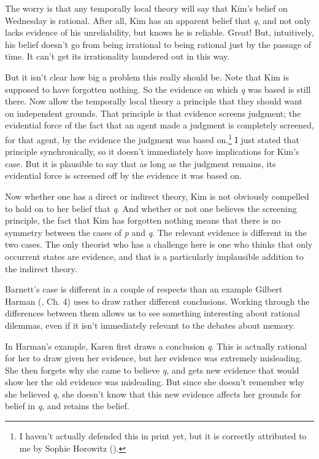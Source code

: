 \documentclass[
  10pt,
  letterpaper,
  DIV=11,
  numbers=noendperiod,
  twoside]{scrartcl}
\begin{document}
The worry is that any temporally local theory will say that Kim's belief
on Wednesday is rational. After all, Kim has an apparent belief that
\emph{q}, and not only lacks evidence of his unreliability, but knows he
is reliable. Great! But, intuitively, his belief doesn't go from being
irrational to being rational just by the passage of time. It can't get
its irrationality laundered out in this way.

But it isn't clear how big a problem this really should be. Note that
Kim is supposed to have forgotten nothing. So the evidence on which
\emph{q} was based is still there. Now allow the temporally local theory
a principle that they should want on independent grounds. That principle
is that evidence screens judgment; the evidential force of the fact that
an agent made a judgment is completely screened, for that agent, by the
evidence the judgment was based on.\footnote{I haven't actually defended
  this in print yet, but it is correctly attributed to me by Sophie
  Horowitz ().} I just stated that
principle synchronically, so it doesn't immediately have implications
for Kim's case. But it is plausible to say that as long as the judgment
remains, its evidential force is screened off by the evidence it was
based on.

Now whether one has a direct or indirect theory, Kim is not obviously
compelled to hold on to her belief that \emph{q}. And whether or not one
believes the screening principle, the fact that Kim has forgotten
nothing means that there is no symmetry between the cases of \emph{p}
and \emph{q}. The relevant evidence is different in the two cases. The
only theorist who has a challenge here is one who thinks that only
occurrent states are evidence, and that is a particularly implausible
addition to the indirect theory.

Barnett's case is different in a couple of respects than an example
Gilbert Harman (, Ch. 4) uses to draw
rather different conclusions. Working through the differences between
them allows us to see something interesting about rational dilemmas,
even if it isn't immediately relevant to the debates about memory.

In Harman's example, Karen first draws a conclusion \emph{q}. This is
actually rational for her to draw given her evidence, but her evidence
was extremely misleading. She then forgets why she came to believe
\emph{q}, and gets new evidence that would show her the old evidence was
misleading. But since she doesn't remember why she believed \emph{q},
she doesn't know that this new evidence affects her grounds for belief
in \emph{q}, and retains the belief.
\end{document}
